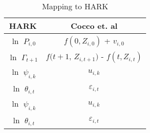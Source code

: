\begin{table}[h]
\centering
\caption{Mapping to HARK}
\label{tab:Mapping}
\begin{tabular}{|c|c|}
\hline
\textbf{HARK} & \textbf{Cocco et. al} \\ \hline
$\ln$ $P_{i,0}$ & $f(0,Z_{i,0})$ + $v_{i,0}$ \\ \hline
$\ln$ $\Gamma_{t+1}$ & $f(t+1$, $Z_{i,t+1})$ - $f(t,Z_{i,t})$ \\ \hline
$\ln$ $\psi_{i,k}$ & $u_{i,k}$ \\ \hline
$\ln$ $\theta_{i,t}$ & $\varepsilon_{i,t}$ \\ \hline
$\ln$ $\psi_{i,k}$ & $u_{i,k}$ \\ \hline
$\ln$ $\theta_{i,t}$ & $\varepsilon_{i,t}$ \\ \hline
\end{tabular}
\end{table}
